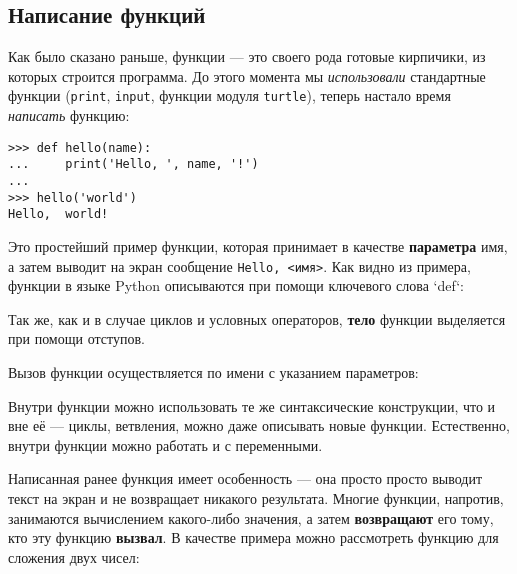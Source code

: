 \subsection{Написание
функций}\label{ux43dux430ux43fux438ux441ux430ux43dux438ux435-ux444ux443ux43dux43aux446ux438ux439}

Как было сказано раньше, функции --- это своего рода готовые кирпичики,
из которых строится программа. До этого момента мы \emph{использовали}
стандартные функции (\texttt{print}, \texttt{input}, функции модуля
\texttt{turtle}), теперь настало время \emph{написать} функцию:

\begin{verbatim}
>>> def hello(name):
...     print('Hello, ', name, '!')
...
>>> hello('world')
Hello,  world!
\end{verbatim}

Это простейший пример функции, которая принимает в качестве
\textbf{параметра} имя, а затем выводит на экран сообщение
\texttt{Hello,\ \textless{}имя\textgreater{}}. Как видно из примера,
функции в языке Python описываются при помощи ключевого слова `def`:

\begin{Shaded}
\begin{Highlighting}[]
 
\end{Highlighting}
\end{Shaded}

Так же, как и в случае циклов и условных операторов, \textbf{тело}
функции выделяется при помощи отступов.

Вызов функции осуществляется по имени с указанием параметров:

\begin{Shaded}
\begin{Highlighting}[]
\NormalTok{)}
\end{Highlighting}
\end{Shaded}

Внутри функции можно использовать те же синтаксические конструкции, что
и вне её --- циклы, ветвления, можно даже описывать новые функции.
Естественно, внутри функции можно работать и с переменными.

Написанная ранее функция имеет особенность --- она просто просто выводит
текст на экран и не возвращает никакого результата. Многие функции,
напротив, занимаются вычислением какого-либо значения, а затем
\textbf{возвращают} его тому, кто эту функцию \textbf{вызвал}. В
качестве примера можно рассмотреть функцию для сложения двух чисел:

